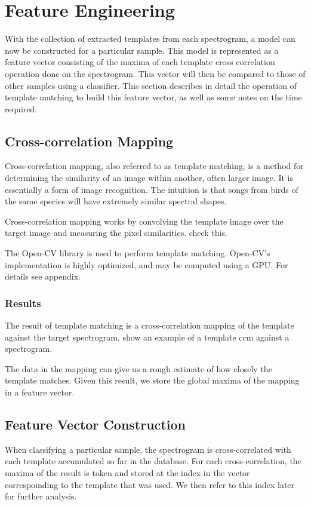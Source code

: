 \section{Feature Engineering}
With the collection of extracted templates from each spectrogram,
a model can now be constructed for a particular sample.
This model is represented as a feature vector consisting of the maxima
of each template cross correlation operation done on the spectrogram.
This vector will then be compared to those of other samples using a
classifier.
This section describes in detail the operation of template matching
to build this feature vector, as well as some notes on the time
required.

\subsection{Cross-correlation Mapping}
Cross-correlation mapping, also referred to as template matching, is
a method for determining the similarity of an image within another,
often larger image.
It is essentially a form of image recognition.
The intuition is that songs from birds of the same species will have
extremely similar spectral shapes.

Cross-correlation mapping works by convolving the template image
over the target image and measuring the pixel similarities.
check this.

The Open-CV library is used to perform template matching.
Open-CV's implementation is highly optimized, and may be computed
using a GPU. For details see appendix.

\subsubsection{Results}
The result of template matching is a cross-correlation mapping of the
template against the target spectrogram.
show an example of a template ccm against a spectrogram.

The data in the mapping can give us a rough estimate of how closely
the template matches.
Given this result, we store the global maxima of the mapping in a
feature vector.

\subsection{Feature Vector Construction}
When classifying a particular sample, the spectrogram is cross-correlated
with each template accumulated so far in the database.
For each cross-correlation, the maxima of the result is taken and stored
at the index in the vector correspoinding to the template that was used.
We then refer to this index later for further analysis.

